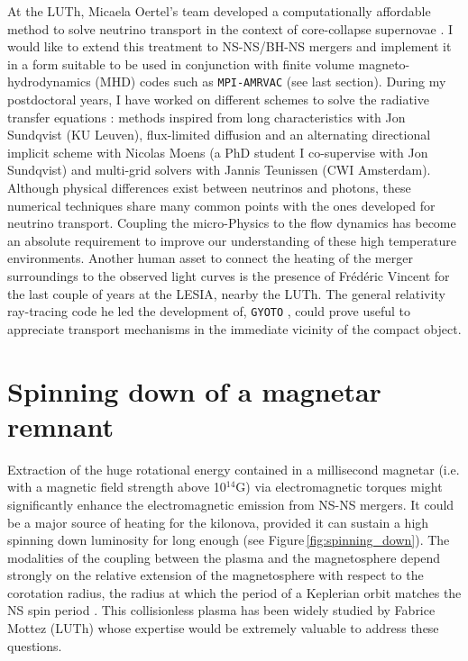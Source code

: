 \documentclass[12pt,onecolumn]{article}
\makeatletter
\newcommand{\mhd}{MHD\xspace}
\newcommand*{\ns}{NS\@\xspace}
\newcommand*{\bh}{BH\@\xspace}
\newcommand*{\eg}{e.g.\@\xspace}
\newcommand*{\ie}{i.e.\@\xspace}
\makeatother
\begin{document}
At the LUTh, Micaela Oertel's team developed a computationally affordable method to solve neutrino transport in the context of core-collapse supernovae \citep{Peres2011,Peres2013}. I would like to extend this treatment to \ns-\ns/\bh-\ns mergers and implement it in a form suitable to be used in conjunction with finite volume magneto-hydrodynamics (\mhd) codes such as \texttt{MPI-AMRVAC} (see last section). During my postdoctoral years, I have worked on different schemes to solve the radiative transfer equations : methods inspired from long characteristics with Jon Sundqvist (KU Leuven), flux-limited diffusion and an alternating directional implicit scheme with Nicolas Moens (a PhD student I co-supervise with Jon Sundqvist) and multi-grid solvers with Jannis Teunissen (CWI Amsterdam). Although physical differences exist between neutrinos and photons, these numerical techniques share many common points with the ones developed for neutrino transport. Coupling the micro-Physics to the flow dynamics has become an absolute requirement to improve our understanding of these high temperature environments. Another human asset to connect the heating of the merger surroundings to the observed light curves is the presence of Fr\'{e}d\'{e}ric Vincent for the last couple of years at the LESIA, nearby the LUTh. The general relativity ray-tracing code he led the development of, \texttt{GYOTO} \citep{Vincent2011}, could prove useful to appreciate transport mechanisms in the immediate vicinity of the compact object.

\section{Spinning down of a magnetar remnant}

Extraction of the huge rotational energy contained in a millisecond magnetar (\ie with a magnetic field strength above 10$^{14}$G) via electromagnetic torques might significantly enhance the electromagnetic emission from \ns-\ns mergers. It could be a major source of heating for the kilonova, provided it can sustain a high spinning down luminosity for long enough (see Figure\,\ref{fig:spinning_down}). The modalities of the coupling between the plasma and the magnetosphere depend strongly on the relative extension of the magnetosphere with respect to the corotation radius, the radius at which the period of a Keplerian orbit matches the \ns spin period \citep[see \eg the propeller effect described in][]{Bozzo2008}. This collisionless plasma has been widely studied by Fabrice Mottez (LUTh) whose expertise would be extremely valuable to address these questions. 
\end{document}
